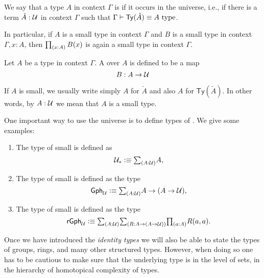 \begin{defn}
We say that a type $A$ in context $\Gamma$ is  if it occurs in the universe, i.e., if there is a term $\check{A}:\mathcal{U}$ in context $\Gamma$ such that $\Gamma\vdash\mathsf{Ty}(\check{A})\equiv A~\mathrm{type}$.
\end{defn}

In particular, if $A$ is a small type in context $\Gamma$ and $B$ is a small type in context $\Gamma,x:A$, then $\prd{x:A}B(x)$ is again a small type in context $\Gamma$.

\begin{defn}
Let $A$ be a type in context $\Gamma$. A  over $A$ is defined to be a map
\begin{equation*}
B:A\to\mathcal{U}
\end{equation*}
\end{defn}

\begin{rmk}
If $A$ is small, we usually write simply $A$ for $\check{A}$ and also $A$ for $\mathsf{Ty}(\check{A})$. In other words, by $A:\mathcal{U}$ we mean that $A$ is a small type. 
\end{rmk}

\begin{eg}
One important way to use the universe is to define types of . We give some examples:
\begin{enumerate}
\item The type of small  is defined as
\begin{equation*}
\UU_\ast\defeq \sm{A:\UU}A,
\end{equation*}
\item The type of small  is defined as the type
\begin{equation*}
\mathsf{Gph}_\UU \defeq \sm{A:\UU} A\to (A\to \UU),
\end{equation*}
\item The type of small  is defined as the type
\begin{equation*}
\mathsf{rGph}_\UU \defeq \sm{A:\UU}{R:A\to (A\to \UU)}\prd{a:A}R(a,a).
\end{equation*}
\end{enumerate}
Once we have introduced the \emph{identity types} we will also be able to state the types of groups, rings, and many other structured types. However, when doing so one has to be cautious to make sure that the underlying type is in the level of sets, in the hierarchy of homotopical complexity of types.
\end{eg}

